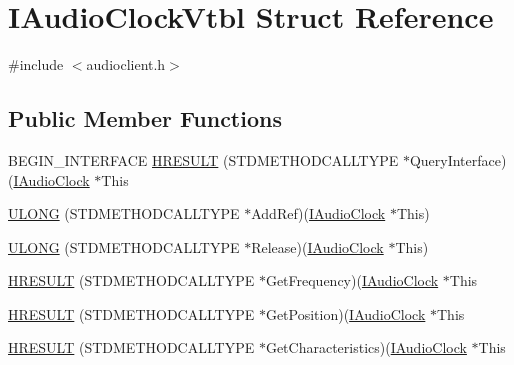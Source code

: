 \hypertarget{struct_i_audio_clock_vtbl}{}\section{I\+Audio\+Clock\+Vtbl Struct Reference}
\label{struct_i_audio_clock_vtbl}


{\ttfamily \#include $<$audioclient.\+h$>$}

\subsection*{Public Member Functions}
\begin{DoxyCompactItemize}
\item 
B\+E\+G\+I\+N\+\_\+\+I\+N\+T\+E\+R\+F\+A\+CE \hyperlink{struct_i_audio_clock_vtbl_a10d117074bc0cb0328da5f3d1399e7ad}{H\+R\+E\+S\+U\+LT} (S\+T\+D\+M\+E\+T\+H\+O\+D\+C\+A\+L\+L\+T\+Y\+PE $\ast$Query\+Interface)(\hyperlink{audioclient_8h_ab3ff14d1ce3862add1ec9aa4ecb5080c}{I\+Audio\+Clock} $\ast$This
\item 
\hyperlink{struct_i_audio_clock_vtbl_a05f317d497d1494855af3717313a5b74}{U\+L\+O\+NG} (S\+T\+D\+M\+E\+T\+H\+O\+D\+C\+A\+L\+L\+T\+Y\+PE $\ast$Add\+Ref)(\hyperlink{audioclient_8h_ab3ff14d1ce3862add1ec9aa4ecb5080c}{I\+Audio\+Clock} $\ast$This)
\item 
\hyperlink{struct_i_audio_clock_vtbl_a95144bc825c9309cd7f5c23d097a1423}{U\+L\+O\+NG} (S\+T\+D\+M\+E\+T\+H\+O\+D\+C\+A\+L\+L\+T\+Y\+PE $\ast$Release)(\hyperlink{audioclient_8h_ab3ff14d1ce3862add1ec9aa4ecb5080c}{I\+Audio\+Clock} $\ast$This)
\item 
\hyperlink{struct_i_audio_clock_vtbl_aeb8b9435f6d02405d0052672592cca4e}{H\+R\+E\+S\+U\+LT} (S\+T\+D\+M\+E\+T\+H\+O\+D\+C\+A\+L\+L\+T\+Y\+PE $\ast$Get\+Frequency)(\hyperlink{audioclient_8h_ab3ff14d1ce3862add1ec9aa4ecb5080c}{I\+Audio\+Clock} $\ast$This
\item 
\hyperlink{struct_i_audio_clock_vtbl_afbc525c7b9a2b271fa446e687a863dbf}{H\+R\+E\+S\+U\+LT} (S\+T\+D\+M\+E\+T\+H\+O\+D\+C\+A\+L\+L\+T\+Y\+PE $\ast$Get\+Position)(\hyperlink{audioclient_8h_ab3ff14d1ce3862add1ec9aa4ecb5080c}{I\+Audio\+Clock} $\ast$This
\item 
\hyperlink{struct_i_audio_clock_vtbl_a5ab79378bd572d98466f0ee783ca781d}{H\+R\+E\+S\+U\+LT} (S\+T\+D\+M\+E\+T\+H\+O\+D\+C\+A\+L\+L\+T\+Y\+PE $\ast$Get\+Characteristics)(\hyperlink{audioclient_8h_ab3ff14d1ce3862add1ec9aa4ecb5080c}{I\+Audio\+Clock} $\ast$This
\end{DoxyCompactItemize}
